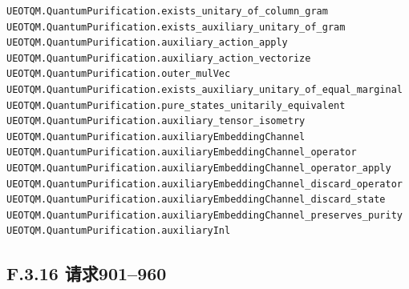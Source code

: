 \documentclass[
  11pt,
  oneside]{book}
\begin{document}
\begin{Verbatim}[breaklines,breakanywhere,fontsize=\scriptsize]
UEOTQM.QuantumPurification.exists_unitary_of_column_gram
UEOTQM.QuantumPurification.exists_auxiliary_unitary_of_gram
UEOTQM.QuantumPurification.auxiliary_action_apply
UEOTQM.QuantumPurification.auxiliary_action_vectorize
UEOTQM.QuantumPurification.outer_mulVec
UEOTQM.QuantumPurification.exists_auxiliary_unitary_of_equal_marginal
UEOTQM.QuantumPurification.pure_states_unitarily_equivalent
UEOTQM.QuantumPurification.auxiliary_tensor_isometry
UEOTQM.QuantumPurification.auxiliaryEmbeddingChannel
UEOTQM.QuantumPurification.auxiliaryEmbeddingChannel_operator
UEOTQM.QuantumPurification.auxiliaryEmbeddingChannel_operator_apply
UEOTQM.QuantumPurification.auxiliaryEmbeddingChannel_discard_operator
UEOTQM.QuantumPurification.auxiliaryEmbeddingChannel_discard_state
UEOTQM.QuantumPurification.auxiliaryEmbeddingChannel_preserves_purity
UEOTQM.QuantumPurification.auxiliaryInl
\end{Verbatim}

\subsection{F.3.16 请求901--960}
\end{document}
